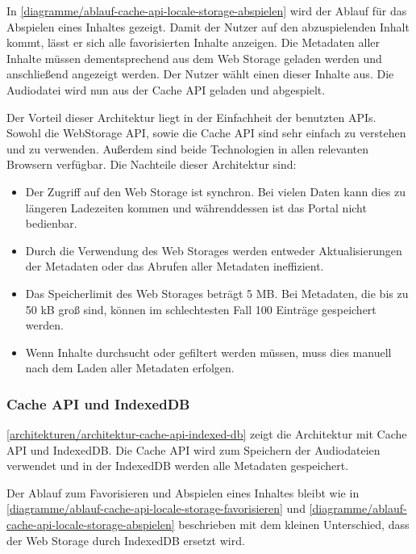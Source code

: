 In \autoref{diagramme/ablauf-cache-api-locale-storage-abspielen} wird der Ablauf für das Abspielen eines Inhaltes gezeigt. Damit der Nutzer auf den abzuspielenden Inhalt kommt, lässt er sich alle favorisierten Inhalte anzeigen. Die Metadaten aller Inhalte müssen dementsprechend aus dem Web Storage geladen werden und anschließend angezeigt werden. Der Nutzer wählt einen dieser Inhalte aus. Die Audiodatei wird nun aus der Cache \ac{API} geladen und abgespielt.


Der Vorteil dieser Architektur liegt in der Einfachheit der benutzten \acp{API}. Sowohl die WebStorage \ac{API}, sowie die Cache \ac{API} sind sehr einfach zu verstehen und zu verwenden. Außerdem sind beide Technologien in allen relevanten Browsern verfügbar. Die Nachteile dieser Architektur sind:

\begin{itemize}
\item Der Zugriff auf den Web Storage ist synchron. Bei vielen Daten kann dies zu längeren Ladezeiten kommen und währenddessen ist das Portal nicht bedienbar. 
\item Durch die Verwendung des Web Storages werden entweder Aktualisierungen der Metadaten oder das Abrufen aller Metadaten ineffizient. 
\item Das Speicherlimit des Web Storages beträgt 5 \ac{MB}. Bei Metadaten, die bis zu 50 \ac{kB} groß sind, können im schlechtesten Fall 100 Einträge gespeichert werden. 
\item Wenn Inhalte durchsucht oder gefiltert werden müssen, muss dies manuell nach dem Laden aller Metadaten erfolgen.
\end{itemize}

\subsubsection{Cache API und IndexedDB}

\autoref{architekturen/architektur-cache-api-indexed-db} zeigt die Architektur mit Cache \ac{API} und IndexedDB. Die Cache \ac{API} wird zum Speichern der Audiodateien verwendet und in der IndexedDB werden alle Metadaten gespeichert.

Der Ablauf zum Favorisieren und Abspielen eines Inhaltes bleibt wie in \autoref{diagramme/ablauf-cache-api-locale-storage-favorisieren} und \autoref{diagramme/ablauf-cache-api-locale-storage-abspielen} beschrieben mit dem kleinen Unterschied, dass der Web Storage durch IndexedDB ersetzt wird. 

